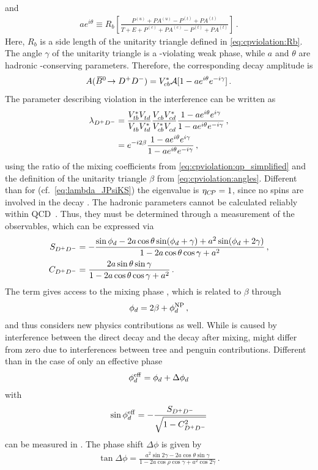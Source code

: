 and
\begin{align}
	ae^{i\theta} \equiv R_b\left[\frac{{P^{(u)} + P\!A^{(u)}} - {P^{(t)} + P\!A^{(t)}}}{T + E + {{P^{(c)} + P\!A^{(c)}} - {P^{(t)} + P\!A^{(t)}}}}\right]\,.
\end{align}
Here, $R_b$ is a side length of the unitarity triangle defined in
\cref{eq:cpviolation:Rb}. The angle $\gamma$ of the unitarity triangle is a
\CP-violating weak phase, while $a$ and $\theta$ are hadronic \CP-conserving
parameters. Therefore, the corresponding \Bzb decay amplitude is
\begin{align}
	A({{\kern 0.18em\overline{\kern -0.18em B}{}}{}^0}\!\rightarrow {\ensuremath{{D}^+}}{\ensuremath{{D}^-}}) = {V_{{c}{b}}^\ast} \mathcal{A}[1 - ae^{i\theta}e^{-i\gamma}]\,.
\end{align}
The parameter describing \CP violation in the interference can be written as
\begin{align}
\begin{split}
	\lambda_{{{D}^+}{{D}^-}} &= \frac{{V_{{t}{b}}^\ast}{V_{{t}{d}}^{}}}{{V_{{t}{b}}^{}}{V_{{t}{d}}^\ast}}\frac{{V_{{c}{b}}^{}}{V_{{c}{d}}^\ast}}{{V_{{c}{b}}^\ast}{V_{{c}{d}}^{}}}\frac{1-ae^{i\theta}e^{i\gamma}}{1-ae^{i\theta}e^{-i\gamma}}\,,\\
					 &= e^{-i2\beta}\frac{1-ae^{i\theta}e^{i\gamma}}{1-ae^{i\theta}e^{-i\gamma}}\,,
\end{split}
\end{align}
using the ratio of the mixing coefficients from
\cref{eq:cpviolation:qp_simplified} and the definition of the unitarity
triangle $\beta$ from \cref{eq:cpviolation:angles}. Different than for
\BdToJPsiKS (cf.~\cref{eq:lambda_JPsiKS}) the \CP eigenvalue is $\eta_{{C\!P}} =
\num{+1}$, since no spins are involved in the decay \BdToDD. The hadronic
parameters cannot be calculated reliably within QCD~\cite{Bel:2015wha}. Thus,
they must be determined through a measurement of the \CP observables, which
can be expressed via
\begin{align}
	S_{{{D}^+}{{D}^-}} &= -\frac{\sin{\ensuremath{\phi_{{d}}}} - 2a \cos\theta\sin({\phi_{{d}}} + \gamma) + a^2\sin({\phi_{{d}}} + 2\gamma)}{1 - 2a\cos\theta\cos\gamma + a^2}\,,\\
	C_{{{D}^+}{{D}^-}} &= \frac{2a\sin\theta\sin\gamma}{1 - 2a\cos\theta\cos\gamma + a^2}\,.
\end{align}
The term \SDD gives access to the mixing phase \phid, which is related to $\beta$ through
\begin{align}
	{\ensuremath{\phi_{{d}}}} = 2\beta + \phi_d^{\mathrm{NP}}\,,
\end{align}
and thus considers new physics contributions as well. While \SDD is caused by
interference between the direct decay and the decay after mixing, \CDD
might differ from zero due to interferences between tree and penguin
contributions. Different than in the case of \BdToJPsiKS only an effective
phase
\begin{align}
	\phi_{{d}}^{\mathrm{eff}} = {\phi_{{d}}} + \Delta{\ensuremath{\phi_{{d}}}}
\end{align}
with
\begin{align}
	\sin\phi_{{d}}^{\mathrm{eff}} = -\frac{S_{{{D}^+}{{D}^-}}}{\sqrt{1 - C_{{{D}^+}{{D}^-}}^2}}
\end{align}
can be measured in \BdToDD. The phase shift $\Delta\phi$ is given by
\begin{align}
	\tan\Delta\phi = \frac{a^2\sin2\gamma - 2a\cos\theta\sin\gamma}{1 - 2a\cos\rho\cos\gamma + a^2\cos2\gamma}\,.
\end{align}

